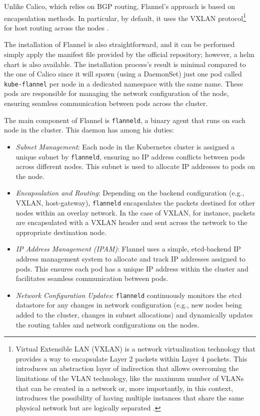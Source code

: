 Unlike Calico, which relies on BGP routing, Flannel's approach is based on
encapsulation methods. In particular, by default, it uses the VXLAN
protocol\footnote{ Virtual Extensible LAN (VXLAN) is a network virtualization
  technology that provides a way to encapsulate Layer 2 packets within Layer 4
  packets. This introduces an abstraction layer of indirection that allows
  overcoming the limitations of the VLAN technology, like the maximum number of
  VLANs that can be created in a network or, more importantly, in this context,
  introduces the possibility of having multiple instances that share the same
  physical network but are logically separated \cite{VXLANnistdef}.}
for host routing across the nodes \cite{flannel-github}.

The installation of Flannel is also straightforward, and it can be performed
simply apply the manifest file provided by the official repository; however, a
helm chart is also available.
The installation process's result is minimal compared to the one of Calico since
it will spawn (using a DaemonSet) just one pod called \texttt{kube-flannel} per
node in a dedicated namespace with the same name. These pods are responsible for
managing the network configuration of the node, ensuring seamless communication
between pods across the cluster.


The main component of Flannel is \texttt{flanneld}, a binary agent that runs on
each node in the cluster. This daemon has among his duties:

\begin{itemize}
  \itemsep0em
  \item \textit{Subnet Management}: Each node in the Kubernetes cluster is
    assigned a unique subnet by \texttt{flanneld}, ensuring no IP address
    conflicts between pods across different nodes. This subnet is used to
    allocate IP addresses to pods on the node.
  \item \textit{Encapsulation and Routing}: Depending on the backend
    configuration (e.g., VXLAN, host-gateway), \texttt{flanneld}
    encapsulates the packets destined for other nodes within an overlay network.
    In the case of VXLAN, for instance, packets are encapsulated with a VXLAN
    header and sent across the network to the appropriate destination node.
 \item \textit{IP Address Management (IPAM)}: Flannel uses a simple,
   etcd-backend IP address management system to allocate and track IP addresses
   assigned to pods. This ensures each pod has a unique IP address within the
   cluster and facilitates seamless communication between pods.
  \item \textit{Network Configuration Updates}: \texttt{flanneld} continuously
    monitors the etcd datastore for any changes in network configuration (e.g.,
    new nodes being added to the cluster, changes in subnet allocations) and
    dynamically updates the routing tables and network configurations on the
    nodes.
\end{itemize}

